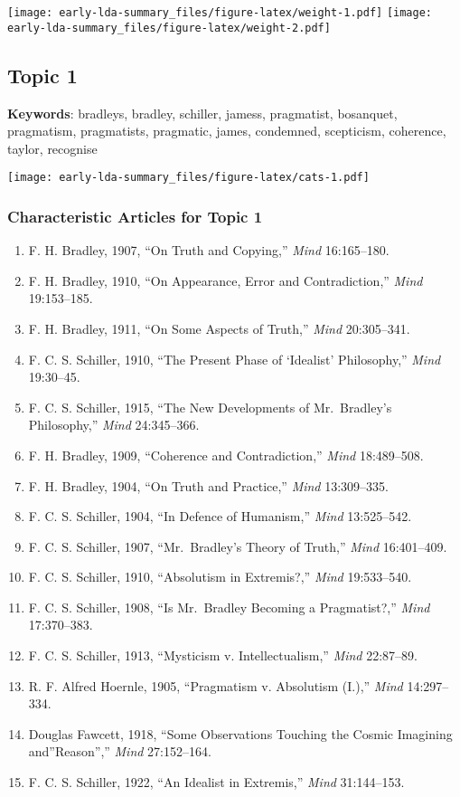 \documentclass[
]{article}
\begin{document}
\texttt{[image: early-lda-summary\_files/figure-latex/weight-1.pdf]}
\newpage 
\texttt{[image: early-lda-summary\_files/figure-latex/weight-2.pdf]}
\newpage 

\hypertarget{topic-1}{%
\subsection{Topic 1}\label{topic-1}}

\textbf{Keywords}: bradleys, bradley, schiller, jamess, pragmatist,
bosanquet, pragmatism, pragmatists, pragmatic, james, condemned,
scepticism, coherence, taylor, recognise

\texttt{[image: early-lda-summary\_files/figure-latex/cats-1.pdf]}
\newpage 

\hypertarget{characteristic-articles-for-topic-1}{%
\subsubsection{Characteristic Articles for Topic
1}\label{characteristic-articles-for-topic-1}}

\begin{enumerate}
\def\labelenumi{\arabic{enumi}.}
\item
  F. H. Bradley, 1907, ``On Truth and Copying,'' \emph{Mind}
  16:165--180.
\item
  F. H. Bradley, 1910, ``On Appearance, Error and Contradiction,''
  \emph{Mind} 19:153--185.
\item
  F. H. Bradley, 1911, ``On Some Aspects of Truth,'' \emph{Mind}
  20:305--341.
\item
  F. C. S. Schiller, 1910, ``The Present Phase of `Idealist'
  Philosophy,'' \emph{Mind} 19:30--45.
\item
  F. C. S. Schiller, 1915, ``The New Developments of Mr.~Bradley's
  Philosophy,'' \emph{Mind} 24:345--366.
\item
  F. H. Bradley, 1909, ``Coherence and Contradiction,'' \emph{Mind}
  18:489--508.
\item
  F. H. Bradley, 1904, ``On Truth and Practice,'' \emph{Mind}
  13:309--335.
\item
  F. C. S. Schiller, 1904, ``In Defence of Humanism,'' \emph{Mind}
  13:525--542.
\item
  F. C. S. Schiller, 1907, ``Mr.~Bradley's Theory of Truth,''
  \emph{Mind} 16:401--409.
\item
  F. C. S. Schiller, 1910, ``Absolutism in Extremis?,'' \emph{Mind}
  19:533--540.
\item
  F. C. S. Schiller, 1908, ``Is Mr.~Bradley Becoming a Pragmatist?,''
  \emph{Mind} 17:370--383.
\item
  F. C. S. Schiller, 1913, ``Mysticism v. Intellectualism,'' \emph{Mind}
  22:87--89.
\item
  R. F. Alfred Hoernle, 1905, ``Pragmatism v. Absolutism (I.),''
  \emph{Mind} 14:297--334.
\item
  Douglas Fawcett, 1918, ``Some Observations Touching the Cosmic
  Imagining and''Reason'','' \emph{Mind} 27:152--164.
\item
  F. C. S. Schiller, 1922, ``An Idealist in Extremis,'' \emph{Mind}
  31:144--153.
\end{enumerate}
\end{document}
